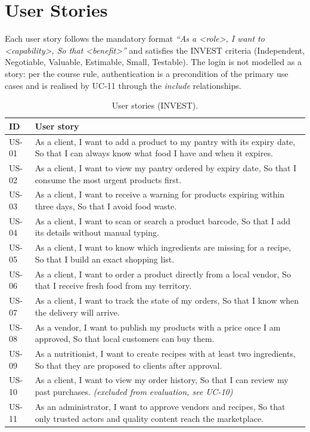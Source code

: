 \chapter{User Stories}\label{ch:stories}

Each user story follows the mandatory format
\emph{``As a \textless role\textgreater, I want to
\textless capability\textgreater, So that \textless benefit\textgreater''}
and satisfies the INVEST criteria (Independent, Negotiable, Valuable,
Estimable, Small, Testable). The login is not modelled as a story: per the
course rule, authentication is a precondition of the primary use cases and
is realised by UC-11 through the \emph{include} relationships.

\begin{table}[H]
\centering
\caption{User stories (INVEST).}
\label{tab:stories}
\begin{tabular}{@{}p{2.0cm}p{11.6cm}@{}}
\toprule
\textbf{ID} & \textbf{User story} \\
\midrule
US-01 & As a client, I want to add a product to my pantry with its expiry date,
So that I can always know what food I have and when it expires. \\
US-02 & As a client, I want to view my pantry ordered by expiry date, So that I
consume the most urgent products first. \\
US-03 & As a client, I want to receive a warning for products expiring within
three days, So that I avoid food waste. \\
US-04 & As a client, I want to scan or search a product barcode, So that I
add its details without manual typing. \\
US-05 & As a client, I want to know which ingredients are missing for a
recipe, So that I build an exact shopping list. \\
US-06 & As a client, I want to order a product directly from a local vendor,
So that I receive fresh food from my territory. \\
US-07 & As a client, I want to track the state of my orders, So that I know
when the delivery will arrive. \\
US-08 & As a vendor, I want to publish my products with a price once I am
approved, So that local customers can buy them. \\
US-09 & As a nutritionist, I want to create recipes with at least two
ingredients, So that they are proposed to clients after approval. \\
\rowcolor[gray]{0.85}
US-10 & As a client, I want to view my order history, So that I
can review my past purchases. \textit{(excluded from evaluation, see UC-10)} \\
US-11 & As an administrator, I want to approve vendors and recipes, So that
only trusted actors and quality content reach the marketplace. \\
\bottomrule
\end{tabular}
\end{table}
